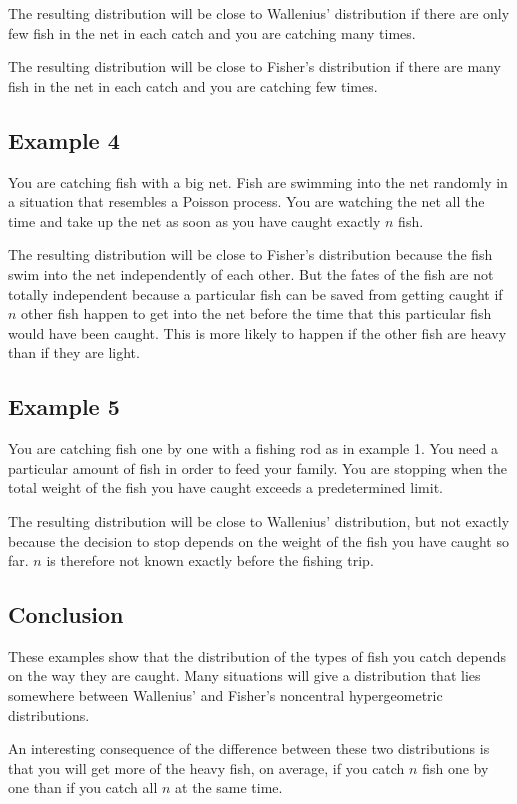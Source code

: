 \documentclass[a4paper]{article}
\begin{document}
The resulting distribution will be close to Wallenius' distribution if 
there are only few fish in the net in each catch and you are catching
many times.

The resulting distribution will be close to Fisher's distribution if 
there are many fish in the net in each catch and you are catching
few times.

\subsection{Example 4}
You are catching fish with a big net. Fish are swimming into the net
randomly in a situation that resembles a Poisson process. You are
watching the net all the time and take up the net as soon as you have
caught exactly $n$ fish.

The resulting distribution will be close to Fisher's distribution
because the fish swim into the net independently of each other.
But the fates of the fish are not totally independent because 
a particular fish can be saved from getting caught if $n$ other 
fish happen to get into the net before the time that this particular
fish would have been caught. This is more likely to happen if the other
fish are heavy than if they are light.

\subsection{Example 5}
You are catching fish one by one with a fishing rod as in example 1.
You need a particular amount of fish in order to feed your family.
You are stopping when the total weight of the fish you have caught
exceeds a predetermined limit.

The resulting distribution will be close to Wallenius' distribution,
but not exactly because the decision to stop depends on the weight of
the fish you have caught so far. $n$ is therefore not known exactly
before the fishing trip.

\subsection{Conclusion}
These examples show that the distribution of the types of 
fish you catch depends on the way they are caught. Many situations
will give a distribution that lies somewhere between Wallenius'
and Fisher's noncentral hypergeometric distributions.

An interesting consequence of the difference between these two
distributions is that you will get more of the heavy fish, on average, 
if you catch $n$ fish one by one than if you catch all $n$
at the same time.
\end{document}
